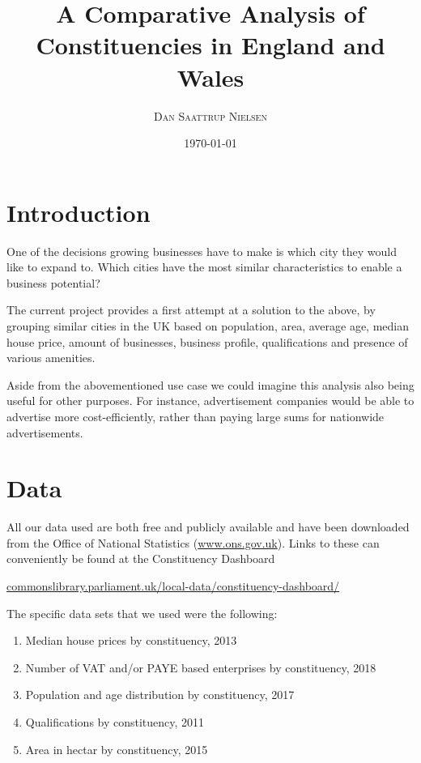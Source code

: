 \documentclass[a4paper, 11pt]{article}
\begin{document}
\title{A Comparative Analysis of Constituencies in England and Wales}
\author{{\small\textsc{Dan Saattrup Nielsen}}}
\date{\today}
\maketitle



\section{Introduction}
One of the decisions growing businesses have to make is which city they would like to expand to. Which cities have the most similar characteristics to enable a business potential?

The current project provides a first attempt at a solution to the above, by grouping similar cities in the UK based on population, area, average age, median house price, amount of businesses, business profile, qualifications and presence of various amenities.

Aside from the abovementioned use case we could imagine this analysis also being useful for other purposes. For instance, advertisement companies would be able to advertise more cost-efficiently, rather than paying large sums for nationwide advertisements.


\section{Data}
All our data used are both free and publicly available and have been downloaded from the Office of National Statistics (\url{www.ons.gov.uk}). Links to these can conveniently be found at the Constituency Dashboard
\begin{center}
  \url{commonslibrary.parliament.uk/local-data/constituency-dashboard/}
\end{center}

The specific data sets that we used were the following:
\begin{enumerate}
  \item Median house prices by constituency, 2013
  \item Number of VAT and/or PAYE based enterprises by constituency, 2018
  \item Population and age distribution by constituency, 2017
  \item Qualifications by constituency, 2011
  \item Area in hectar by constituency, 2015
\end{enumerate}
\end{document}
